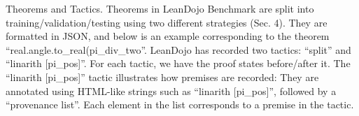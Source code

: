 \documentclass[
]{article}
\newenvironment{Shaded}{}{}
\newcommand{\CharTok}[1]{\textcolor[rgb]{0.25,0.44,0.63}{#1}}
\newcommand{\DataTypeTok}[1]{\textcolor[rgb]{0.56,0.13,0.00}{#1}}
\newcommand{\DecValTok}[1]{\textcolor[rgb]{0.25,0.63,0.44}{#1}}
\newcommand{\ErrorTok}[1]{\textcolor[rgb]{1.00,0.00,0.00}{\textbf{#1}}}
\newcommand{\FunctionTok}[1]{\textcolor[rgb]{0.02,0.16,0.49}{#1}}
\newcommand{\OtherTok}[1]{\textcolor[rgb]{0.00,0.44,0.13}{#1}}
\newcommand{\StringTok}[1]{\textcolor[rgb]{0.25,0.44,0.63}{#1}}
\begin{document}
\begin{Shaded}
\end{Shaded}

Theorems and Tactics. Theorems in LeanDojo Benchmark are split into
training/validation/testing using two different strategies (Sec. 4).
They are formatted in JSON, and below is an example corresponding to the
theorem ``real.angle.to\_real(pi\_div\_two''. LeanDojo has recorded two
tactics: ``split'' and ``linarith {[}pi\_pos{]}''. For each tactic, we
have the proof states before/after it. The ``linarith {[}pi\_pos{]}''
tactic illustrates how premises are recorded: They are annotated using
HTML-like strings such as ``linarith {[}pi\_pos{]}'', followed by a
``provenance list''. Each element in the list corresponds to a premise
in the tactic.
\end{document}
